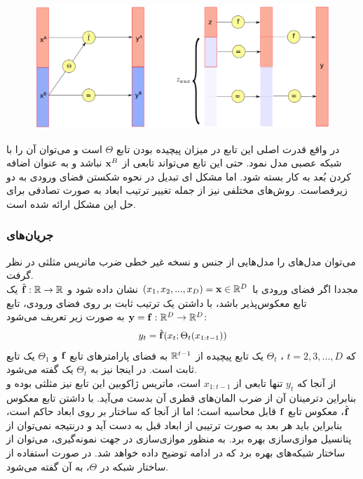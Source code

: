 \begin{figure}[H]
	\centering
	\includegraphics[width=.7\textwidth]{images/flow-survey1.png}
	\caption{
	}
\end{figure}

در واقع قدرت اصلی این تابع در میزان پیچیده بودن تابع $\Theta$ است و می‌توان آن را با شبکه عصبی مدل نمود. حتی این تابع می‌تواند تابعی از ${\bf x}^B$ نباشد و به عنوان اضافه کردن بُعد به کار بسته شود. اما مشکل ای تبدیل در نحوه شکستن فضای ورودی به دو زیرفصاست. روش‌های مختلفی نیز از جمله تغییر ترتیب ابعاد به صورت تصادفی برای حل این مشکل ارائه شده است.
\subsubsection{جریان‌های \autoregressive{}}
می‌توان مدل‌های \autoregressive{} را مدل‌هایی از جنس \normalizingflownets{} و نسخه غیر خطی ضرب ماتریس مثلثی در نظر گرفت.
\\
مجددا اگر فضای ورودی با
$(x_1, x_2, ..., x_D) = {\bf x} \in {\mathbb{R}}^D$
 نشان داده شود و
$\hat{{\bf f}} : {\mathbb{R}} \rightarrow {\mathbb{R}}$
یک تابع معکوس‌پذیر باشد، با داشتن یک ترتیب ثابت بر روی فضای ورودی، تابع \autoregressive{}
${\bf y} = {\bf f} : {\mathbb{R}}^D \rightarrow {\mathbb{R}}^D$
به صورت زیر تعریف می‌شود:
\begin{align}
y_t = \hat{{\bf f}}(x_t; \Theta_t(x_{1:t-1}))
\end{align}
که $t= 2, 3, ..., D$
، $\Theta_t$
  یک تابع پیچیده از ${\mathbb{R}}^{t-1}$ به فضای پارامترهای تابع ${\bf f}$ و $\Theta_1$ یک تابع ثابت است. در اینجا نیز به $\Theta_t$ یک \conditioner{} گفته می‌شود.
  \\
 از آنجا که $y_t$ تنها تابعی از $x_{1:t-1}$ است، ماتریس ژاکوبین این تابع نیز مثلثی بوده و بنابراین دترمینان آن از ضرب المان‌های قطری آن بدست می‌آید. با داشتن تابع معکوس $\hat{{\bf f}}$، معکوس تابع ${\bf f}$ قابل محاسبه است؛ اما از آنجا که ساختار \autoregressive{} بر روی ابعاد حاکم است، بنابراین  باید هر بعد به صورت ترتیبی از ابعاد قبل به دست آید و درنتیجه نمی‌توان از پتانسیل موازی‌سازی 
 بهره برد. به منظور موازی‌سازی در جهت نمونه‌گیری، می‌توان از ساختار شبکه‌های  بهره برد که در ادامه توضیح داده خواهد شد.
 در صورت استفاده از ساختار شبکه  در $\Theta$، به آن  گفته می‌شود.

